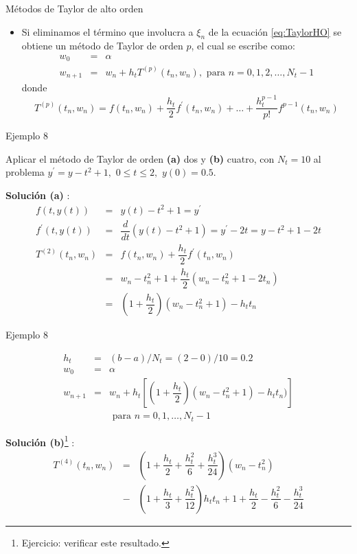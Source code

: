 \documentclass{beamer}
\begin{document}
\begin{frame}{Métodos de Taylor de alto orden}
\begin{itemize}
	\item Si eliminamos el término que involucra a $\xi_n$ de la ecuación \eqref{eq:TaylorHO} se obtiene un método de Taylor de orden $p$, el cual se escribe como:
	\begin{eqnarray*}
	w_0 & = & \alpha \\
	w_{n+1} & = & w_n + h_t T^{(p)}(t_n, w_n), \text{ para }  n = 0, 1,2, \dots , N_t-1
	\end{eqnarray*}
	donde
	\begin{displaymath}
	T^{(p)}(t_n, w_n) = f(t_n,w_n) + \dfrac{h_t}{2} f^\prime(t_n,w_n) + \dots + \dfrac{h_t^{p-1}}{p!} f^{p-1}(t_n,w_n) 
	\end{displaymath}
\end{itemize}
\end{frame}

\begin{frame}{Ejemplo 8}
\begin{block}{}
	Aplicar el método de Taylor de orden \textbf{(a)} dos y \textbf{(b)} cuatro, con $N_t = 10$ al problema $y^\prime = y -t^2 + 1, \,\, 0 \leq t \leq 2, \,\, y(0) = 0.5$.
\end{block}
\textbf{Solución (a)} : 
\begin{eqnarray*}
	f(t,y(t)) & = & y(t) -t^2 + 1 = y^\prime \\
	f^\prime(t,y(t)) & = & \dfrac{d}{dt}(y(t) -t^2 + 1) = y^\prime - 2t = y - t^2 + 1 - 2t \\
	T^{(2)}(t_n, w_n) & = & f(t_n,w_n) + \dfrac{h_t}{2} f^\prime(t_n,w_n) \\ 
		& = & w_n - t_n^2 + 1 + \dfrac{h_t}{2} (w_n - t_n^2 + 1 - 2t_n) \\
		& = & \left( 1 + \dfrac{h_t}{2}\right) (w_n - t_n^2 + 1) - h_t t_n
\end{eqnarray*}

\end{frame}

\begin{frame}{Ejemplo 8}

{\small
\begin{block}{}
\begin{eqnarray*}
h_t & = & (b-a)/N_t = (2-0)/10 = 0.2 \\
w_0 & = & \alpha \\
w_{n+1} & = & w_n + h_t \left[\left( 1 + \dfrac{h_t}{2}\right) (w_n - t_n^2 + 1) - h_t t_n)\right] \\
& & \text{ para } n = 0,1, \dots, N_t-1
\end{eqnarray*}
\end{block}
\textbf{Solución (b)}\footnote{Ejercicio: verificar este resultado.} :
\begin{eqnarray*}
T^{(4)}(t_n, w_n) & = & \left( 1 + \dfrac{h_t}{2} + \dfrac{h_t^2}{6} +  \dfrac{h_t^3}{24}\right)(w_n - t_n^2) \\
& - & \left( 1 + \dfrac{h_t}{3} + \dfrac{h_t^2}{12}\right)h_t t_n %
 +  1 + \dfrac{h_t}{2} - \dfrac{h_t^2}{6} - \dfrac{h_t^3}{24}
\end{eqnarray*}
}
\end{frame}
\end{document}
